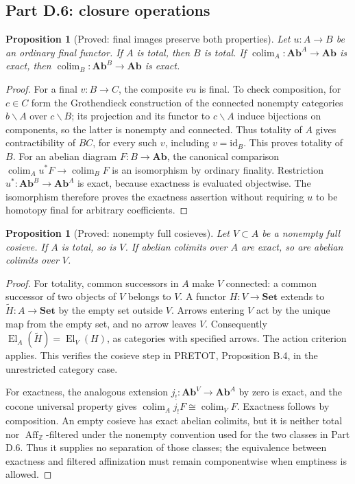 \documentclass[11pt,a4paper]{article}
\newcommand{\Set}{\mathbf{Set}}
\newcommand{\Ab}{\mathbf{Ab}}
\newcommand{\Z}{\mathbb Z}
\newcommand{\El}{\operatorname{El}}
\newcommand{\Aff}{\operatorname{Aff}}
\newcommand{\colim}{\operatorname*{colim}}
\newcommand{\id}{\mathrm{id}}
\newtheorem{proposition}[theorem]{Proposition}
\theoremstyle{definition}
\begin{document}
\subsection{Part D.6: closure operations}
\begin{proposition}[Proved: final images preserve both properties]\label{D:final-images}
Let $u:A\to B$ be an ordinary final functor. If $A$ is total, then $B$ is total. If $\colim_A:\Ab^A\to\Ab$ is exact, then $\colim_B:\Ab^B\to\Ab$ is exact.
\end{proposition}
\begin{proof}
For a final $v:B\to C$, the composite $vu$ is final. To check composition, for $c\in C$ form the Grothendieck construction of the connected nonempty categories $b\backslash A$ over $c\backslash B$; its projection and its functor to $c\backslash A$ induce bijections on components, so the latter is nonempty and connected. Thus totality of $A$ gives contractibility of $BC$, for every such $v$, including $v=\id_B$. This proves totality of $B$. For an abelian diagram $F:B\to\Ab$, the canonical comparison $\colim_Au^*F\to\colim_BF$ is an isomorphism by ordinary finality. Restriction $u^*:\Ab^B\to\Ab^A$ is exact, because exactness is evaluated objectwise. The isomorphism therefore proves the exactness assertion without requiring $u$ to be homotopy final for arbitrary coefficients.
\end{proof}

\begin{proposition}[Proved: nonempty full cosieves]\label{D:cosieves}
Let $V\subset A$ be a nonempty full cosieve. If $A$ is total, so is $V$. If abelian colimits over $A$ are exact, so are abelian colimits over $V$.
\end{proposition}
\begin{proof}
For totality, common successors in $A$ make $V$ connected: a common successor of two objects of $V$ belongs to $V$. A functor $H:V\to\Set$ extends to $\widetilde H:A\to\Set$ by the empty set outside $V$. Arrows entering $V$ act by the unique map from the empty set, and no arrow leaves $V$. Consequently $\El_A(\widetilde H)=\El_V(H)$, as categories with specified arrows. The action criterion applies. This verifies the cosieve step in PRETOT, Proposition B.4, in the unrestricted category case.

For exactness, the analogous extension $j_!: \Ab^V\to\Ab^A$ by zero is exact, and the cocone universal property gives $\colim_Aj_!F\cong\colim_VF$. Exactness follows by composition. An empty cosieve has exact abelian colimits, but it is neither total nor $\Aff_\Z$-filtered under the nonempty convention used for the two classes in Part D.6. Thus it supplies no separation of those classes; the equivalence between exactness and filtered affinization must remain componentwise when emptiness is allowed.
\end{proof}
\end{document}
